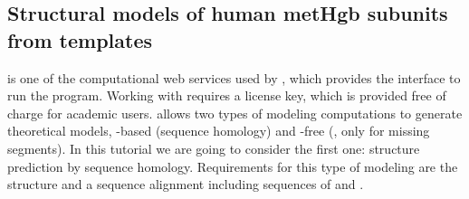 \subsection*{Structural models of human metHgb subunits from templates}

 \modeller \citep{sali1993} is one of the computational web services used by \chimera, which provides the interface to run the program. Working with \modeller requires a license key, which is provided free of charge for academic users. \modeller allows two types of modeling computations to generate theoretical models, -based (sequence homology) and -free (, only for missing segments). In this tutorial we are going to consider the first one: structure prediction by sequence homology. Requirements for this type of modeling are the  structure and a sequence alignment including sequences of  and . 
 
